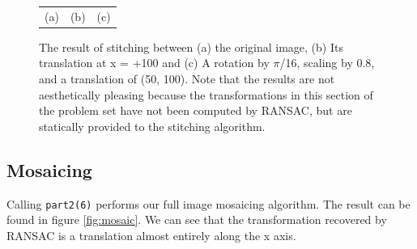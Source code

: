 \documentclass[11pt]{article} %
\begin{document}
\begin{figure}[H]
\begin{tabular}{ccc}
		(a) & (b) & (c)
	\end{tabular} 
	\caption{The result of stitching between (a) the original image, (b) Its translation at x = +100 and (c) A rotation by $\pi$/16, scaling by 0.8, and a translation of (50, 100). Note that the results are not aesthetically pleasing because the transformations in this section of the problem set have not been computed by RANSAC, but are statically provided to the stitching algorithm.}
	\label{fig:stitched_static}
\end{figure}

\subsection{Mosaicing}

Calling \texttt{part2(6)} performs our full image mosaicing algorithm. The result can be found in figure \ref{fig:mosaic}.
We can see that the transformation recovered by RANSAC is a translation almost entirely along the x axis. 
\end{document}

